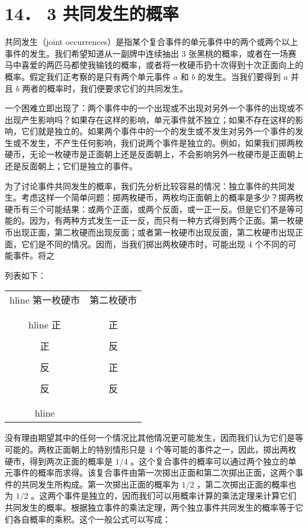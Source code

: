 \section*{14． 3 共同发生的概率}
共同发生（joint occurrences）是指某个复合事件的单元事件中的两个或两个以上事件的发生。我们希望知道从一副牌中连续抽出 3 张黑桃的概率，或者在一场赛马中喜爱的两匹马都使我输钱的概率，或者将一枚硬币扔十次得到十次正面向上的概率。假定我们正考察的是只有两个单元事件 $a$ 和 $b$ 的发生。当我们要得到 $a$ 并且 $b$ 两者的概率时，我们便要求它们的共同发生。

一个困难立即出现了：两个事件中的一个出现或不出现对另外一个事件的出现或不出现产生影响吗？如果存在这样的影响，单元事件就不独立；如果不存在这样的影响，它们就是独立的。如果两个事件中的一个的发生或不发生对另外一个事件的发生或不发生，不产生任何影响，我们说两个事件是独立的。例如，如果我们掷两枚硬币，无论一枚硬市是正面朝上还是反面朝上，不会影响另外一枚硬市是正面朝上还是反面朝上；它们是独立的事件。

为了讨论事件共同发生的概率，我们先分析比较容易的情况：独立事件的共同发生。考虑这样一个简单问题：掷两枚硬币，两枚均正面朝上的概率是多少？掷两枚硬币有三个可能结果：或两个正面，或两个反面，或一正一反。但是它们不是等可能的。因为，有两种方式发生一正一反，而只有一种方式得到两个正面。第一枚硬币出现正面，第二枚硬而出现反面；或者第一枚硬市出现反面，第二枚硬市出现正面，它们是不同的情况。因而，当我们掷出两枚硬市时，可能出现 4 个不同的可能事件。将之

列表如下：

\begin{center}
\begin{tabular}{|cc|}
\\hline
第一枚硬市 & 第二枚硬市 \\\\
\\hline
正 & 正 \\\\
正 & 反 \\\\
反 & 正 \\\\
反 & 反 \\\\
\\hline
\end{tabular}
\end{center}

没有理由期望其中的任何一个情况比其他情况更可能发生，因而我们认为它们是等可能的。两枚正面朝上的特别情形只是 4 个等可能的事件之一，因此，掷出两枚硬市，得到两次正面的概率是 $1 / 4$ 。这个复合事件的概率可以通过两个独立的单元事件的概率而求得。该复合事件由第一次掷出正面和第二次掷出正面，这两个事件的共同发生所构成。第一次掷出正面的概率为 $1 / 2$ ，第二次掷出正面的概率也为 $1 / 2$ 。这两个事件是独立的，因而我们可以用概率计算的乘法定理来计算它们共同发生的概率。根据独立事件的乘法定理，两个独立事件共同发生的概率等于它们各自概率的乘积。这个一般公式可以写成：

